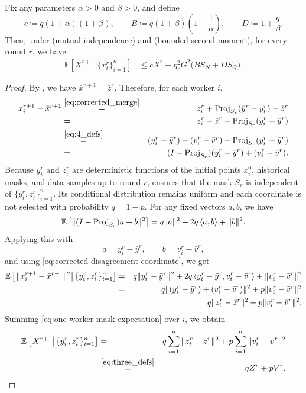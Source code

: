 \documentclass{article}
\newcommand{\anglebr}[1]{\left\langle#1\right\rangle} %
\newcommand{\inner}[2]{\anglebr{#1, #2}}
\newcommand{\eqdef}{\coloneqq}
\newcommand{\Exp}[1]{{\mathbb{E}} \left[ #1 \right]}
\newcommand{\ExpCond}[2]{{\mathbb{E}}\left[\left.#1\right\vert#2\right]}
\newcommand{\Proj}{{\rm Proj}} %
\theoremstyle{plain}
\theoremstyle{definition}
\begin{document}
\begin{lemma}\label{lem:edr}Fix any parameters \(\alpha>0\) and \(\beta>0\), and define
\[
c \eqdef q(1+\alpha)(1+\beta),
\qquad
B \eqdef q(1+\beta)\left(1+\frac1\alpha\right),
\qquad
D \eqdef 1+\frac{q}{\beta}.
\]
Then, under  (mutual independence) and  (bounded second moment), for every round \(r\), we have
\begin{align}
\ExpCond{ X^{r+1} }{ \{x_i^r\}_{i=1}^n }
&\leq
c X^{r}
+
\eta_r^2 G^2\bigl(BS_N + DS_Q\bigr).
\label{eq:delay-corrected-disagreement-recursion}
\end{align}
\end{lemma}

\begin{proof}
By , we have
\(
\bar x^{r+1}=\bar z^r.
\)
Therefore, for each worker \(i\),
\begin{eqnarray}
x_i^{r+1}-\bar x^{r+1}
&\overset{\eqref{eq:corrected_merge}}{=}&
z_i^r+\Proj_{S_r}(\bar y^r-y_i^r)-\bar z^r
\notag\\
&=&
z_i^r-\bar z^r-\Proj_{S_r}(y_i^r-\bar y^r)
\notag\\
&\overset{\eqref{eq:4_defs}}{=}&
(y_i^r-\bar y^r)+(v_i^r-\bar v^r)-\Proj_{S_r}(y_i^r-\bar y^r)
\notag\\
&=&
(I-\Proj_{S_r})(y_i^r-\bar y^r)+(v_i^r-\bar v^r).
\label{eq:corrected-disagreement-coordinate}
\end{eqnarray}
Because $y_i^r$ and $z_i^r$ are deterministic functions of the initial points $x_i^0$, historical masks, and data samples up to round $r$,  ensures that the mask $S_r$ is independent of $\{y_i^r, z_i^r\}_{i=1}^n$.
Its conditional distribution remains uniform and each coordinate is not selected with
probability \(q=1-p\). 
For any fixed vectors \(a,b\), we have
\[
\Exp{\|(I-\Proj_{S_r})a+b\|^2}
=
q\|a\|^2+2q\inner{a}{b}+\|b\|^2.
\]
Applying this with
\[
a=y_i^r-\bar y^r,
\qquad
b=v_i^r-\bar v^r,
\]
and using \eqref{eq:corrected-disagreement-coordinate}, we get
\begin{eqnarray}
\ExpCond{\|x_i^{r+1}-\bar x^{r+1}\|^2}{\{y_i^r,z_i^r\}_{i=1}^n}
&=&
q\|y_i^r-\bar y^r\|^2
+
2q\inner{y_i^r-\bar y^r}{v_i^r-\bar v^r}
+
\|v_i^r-\bar v^r\|^2
\notag\\
&=&
q\|(y_i^r-\bar y^r)+(v_i^r-\bar v^r)\|^2
+
p\|v_i^r-\bar v^r\|^2
\notag\\
&=&
q\|z_i^r-\bar z^r\|^2
+
p\|v_i^r-\bar v^r\|^2.
\label{eq:one-worker-mask-expectation}
\end{eqnarray}
Summing \eqref{eq:one-worker-mask-expectation} over \(i\), we obtain
\begin{eqnarray}
\ExpCond{X^{r+1}}{\{y_i^r,z_i^r\}_{i=1}^n}
&=&
q\sum_{i=1}^n\|z_i^r-\bar z^r\|^2
+
p\sum_{i=1}^n\|v_i^r-\bar v^r\|^2
\notag\\
&\overset{\eqref{eq:three_defs}}{=}&
qZ^r+pV^r.
\label{eq:mask-disagreement-exact}
\end{eqnarray}


\end{proof}
\end{document}
